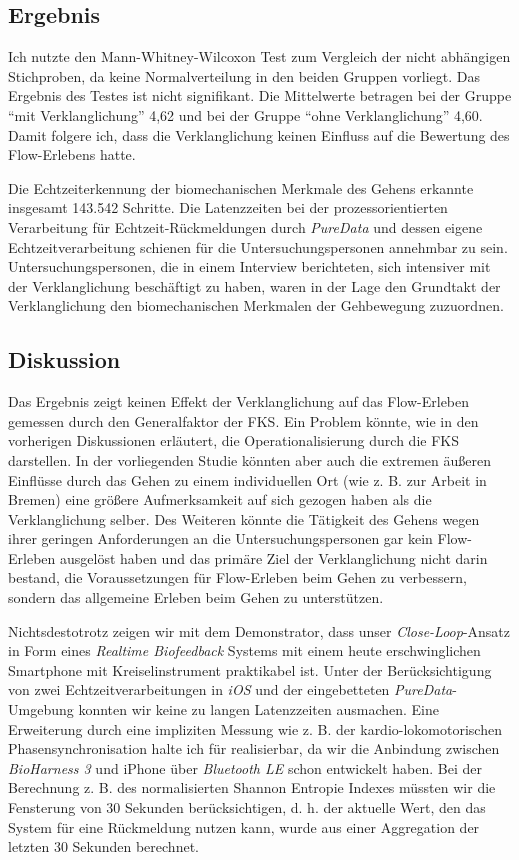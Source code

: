 \subsection{Ergebnis}
Ich nutzte den Mann-Whitney-Wilcoxon Test zum Vergleich der nicht abhängigen Stichproben, da keine Normalverteilung in den beiden Gruppen vorliegt. Das Ergebnis des Testes ist nicht signifikant. Die Mittelwerte betragen bei der Gruppe "`mit Verklanglichung"' 4,62 und bei der Gruppe "`ohne Verklanglichung"' 4,60. Damit folgere ich, dass die Verklanglichung keinen Einfluss auf die Bewertung des Flow-Erlebens hatte. 

Die Echtzeiterkennung der biomechanischen Merkmale des Gehens erkannte insgesamt 143.542 Schritte. Die Latenzzeiten bei der prozessorientierten Verarbeitung für Echtzeit-Rückmeldungen durch \emph{PureData} und dessen eigene Echtzeitverarbeitung schienen für die Untersuchungspersonen annehmbar zu sein. Untersuchungspersonen, die in einem Interview berichteten, sich intensiver mit der Verklanglichung beschäftigt zu haben, waren in der Lage den Grundtakt der Verklanglichung den biomechanischen Merkmalen der Gehbewegung zuzuordnen.

\subsection{Diskussion} 
Das Ergebnis zeigt keinen Effekt der Verklanglichung auf das Flow-Erleben gemessen durch den Generalfaktor der \ac{FKS}. Ein Problem könnte, wie in den vorherigen Diskussionen erläutert, die Operationalisierung durch die \ac{FKS} darstellen. In der vorliegenden Studie könnten aber auch die extremen äußeren Einflüsse durch das Gehen zu einem individuellen Ort (wie z. B. zur Arbeit in Bremen) eine größere Aufmerksamkeit auf sich gezogen haben als die Verklanglichung selber. Des Weiteren könnte die Tätigkeit des Gehens wegen ihrer geringen Anforderungen an die Untersuchungspersonen gar kein Flow-Erleben ausgelöst haben und das primäre Ziel der Verklanglichung nicht darin bestand, die Voraussetzungen für Flow-Erleben beim Gehen zu verbessern, sondern das allgemeine Erleben beim Gehen zu unterstützen. 

Nichtsdestotrotz zeigen wir mit dem Demonstrator, dass unser \emph{Close-Loop}-Ansatz in Form eines \emph{Realtime Biofeedback} Systems mit einem heute erschwinglichen Smartphone mit Kreiselinstrument praktikabel ist. Unter der Berücksichtigung von zwei Echtzeitverarbeitungen in \emph{iOS} und der eingebetteten \emph{PureData}-Umgebung konnten wir keine zu langen Latenzzeiten ausmachen. Eine Erweiterung durch eine impliziten Messung wie z. B. der kardio-lokomotorischen Phasensynchronisation halte ich für realisierbar, da wir die Anbindung zwischen \emph{BioHarness 3} und iPhone über \emph{Bluetooth LE} schon entwickelt haben. Bei der Berechnung z. B. des normalisierten Shannon Entropie Indexes müssten wir die Fensterung von 30 Sekunden berücksichtigen, d. h. der aktuelle Wert, den das System für eine Rückmeldung nutzen kann, wurde aus einer Aggregation der letzten 30 Sekunden berechnet. 

